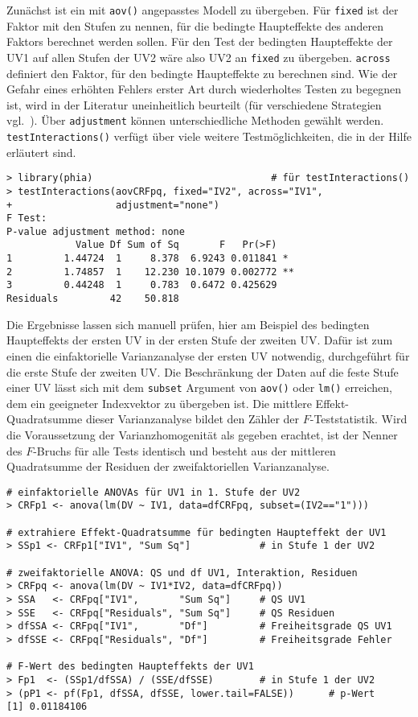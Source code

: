 Zunächst ist ein mit \lstinline!aov()! angepasstes Modell zu übergeben. Für \lstinline!fixed! ist der Faktor mit den Stufen zu nennen, für die bedingte Haupteffekte des anderen Faktors berechnet werden sollen. Für den Test der bedingten Haupteffekte der UV1 auf allen Stufen der UV2 wäre also UV2 an \lstinline!fixed! zu übergeben. \lstinline!across! definiert den Faktor, für den bedingte Haupteffekte zu berechnen sind. Wie der Gefahr eines erhöhten Fehlers erster Art durch wiederholtes Testen zu begegnen ist, wird in der Literatur uneinheitlich beurteilt (für verschiedene Strategien vgl.\ ). Über \lstinline!adjustment! können unterschiedliche Methoden gewählt werden. \lstinline!testInteractions()! verfügt über viele weitere Testmöglichkeiten, die in der Hilfe erläutert sind.
\begin{lstlisting}
> library(phia)                               # für testInteractions()
> testInteractions(aovCRFpq, fixed="IV2", across="IV1",
+                  adjustment="none")
F Test:
P-value adjustment method: none
            Value Df Sum of Sq       F   Pr(>F)
1         1.44724  1     8.378  6.9243 0.011841 *
2         1.74857  1    12.230 10.1079 0.002772 **
3         0.44248  1     0.783  0.6472 0.425629
Residuals         42    50.818
\end{lstlisting}

Die Ergebnisse lassen sich manuell prüfen, hier am Beispiel des bedingten Haupteffekts der ersten UV in der ersten Stufe der zweiten UV. Dafür ist zum einen die einfaktorielle Varianzanalyse der ersten UV notwendig, durchgeführt für die erste Stufe der zweiten UV. Die Beschränkung der Daten auf die feste Stufe einer UV lässt sich mit dem \lstinline!subset! Argument von \lstinline!aov()! oder \lstinline!lm()! erreichen, dem ein geeigneter Indexvektor zu übergeben ist. Die mittlere Effekt-Quadratsumme dieser Varianzanalyse bildet den Zähler der $F$-Teststatistik. Wird die Voraussetzung der Varianzhomogenität als gegeben erachtet, ist der Nenner des $F$-Bruchs für alle Tests identisch und besteht aus der mittleren Quadratsumme der Residuen der zweifaktoriellen Varianzanalyse.
\begin{lstlisting}
# einfaktorielle ANOVAs für UV1 in 1. Stufe der UV2
> CRFp1 <- anova(lm(DV ~ IV1, data=dfCRFpq, subset=(IV2=="1")))

# extrahiere Effekt-Quadratsumme für bedingten Haupteffekt der UV1
> SSp1 <- CRFp1["IV1", "Sum Sq"]            # in Stufe 1 der UV2

# zweifaktorielle ANOVA: QS und df UV1, Interaktion, Residuen
> CRFpq <- anova(lm(DV ~ IV1*IV2, data=dfCRFpq))
> SSA   <- CRFpq["IV1",       "Sum Sq"]     # QS UV1
> SSE   <- CRFpq["Residuals", "Sum Sq"]     # QS Residuen
> dfSSA <- CRFpq["IV1",       "Df"]         # Freiheitsgrade QS UV1
> dfSSE <- CRFpq["Residuals", "Df"]         # Freiheitsgrade Fehler

# F-Wert des bedingten Haupteffekts der UV1
> Fp1  <- (SSp1/dfSSA) / (SSE/dfSSE)        # in Stufe 1 der UV2
> (pP1 <- pf(Fp1, dfSSA, dfSSE, lower.tail=FALSE))      # p-Wert
[1] 0.01184106
\end{lstlisting}

